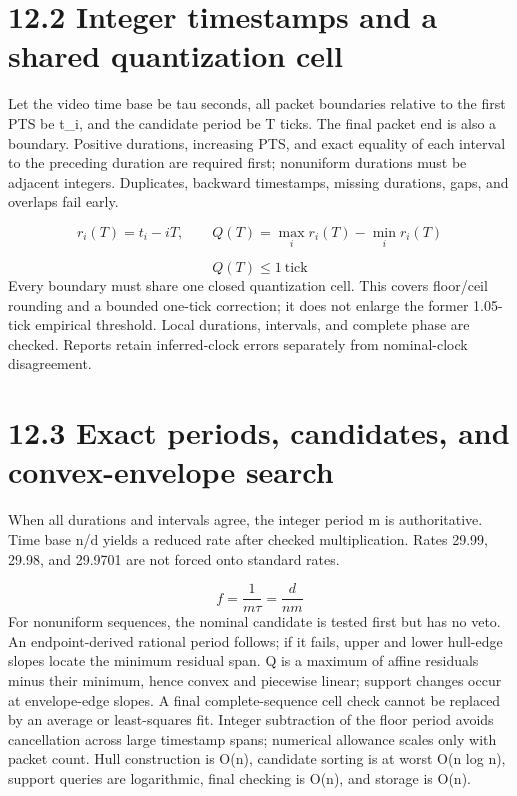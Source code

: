 \documentclass[11pt,a4paper,openany]{book}
\begin{document}
\section*{12.2 Integer timestamps and a shared quantization cell}
Let the video time base be tau seconds, all packet boundaries relative to the first PTS be t\_i, and the candidate period be T ticks. The final packet end is also a boundary. Positive durations, increasing PTS, and exact equality of each interval to the preceding duration are required first; nonuniform durations must be adjacent integers. Duplicates, backward timestamps, missing durations, gaps, and overlaps fail early.


\begin{equation}
r_i(T)=t_i-iT,\qquad Q(T)=\max_i r_i(T)-\min_i r_i(T)
\end{equation}

\begin{equation}
Q(T)\leq 1\ \mathrm{tick}
\end{equation}
Every boundary must share one closed quantization cell. This covers floor/ceil rounding and a bounded one-tick correction; it does not enlarge the former 1.05-tick empirical threshold. Local durations, intervals, and complete phase are checked. Reports retain inferred-clock errors separately from nominal-clock disagreement.


\section*{12.3 Exact periods, candidates, and convex-envelope search}
When all durations and intervals agree, the integer period m is authoritative. Time base n/d yields a reduced rate after checked multiplication. Rates 29.99, 29.98, and 29.9701 are not forced onto standard rates.


\begin{equation}
f=\frac{1}{m\tau}=\frac{d}{nm}
\end{equation}
For nonuniform sequences, the nominal candidate is tested first but has no veto. An endpoint-derived rational period follows; if it fails, upper and lower hull-edge slopes locate the minimum residual span. Q is a maximum of affine residuals minus their minimum, hence convex and piecewise linear; support changes occur at envelope-edge slopes. A final complete-sequence cell check cannot be replaced by an average or least-squares fit. Integer subtraction of the floor period avoids cancellation across large timestamp spans; numerical allowance scales only with packet count. Hull construction is O(n), candidate sorting is at worst O(n log n), support queries are logarithmic, final checking is O(n), and storage is O(n).
\end{document}
